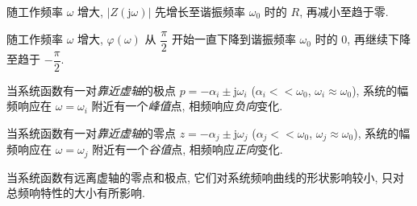 随工作频率 $\omega$ 增大, $|Z(\mathrm{j}\omega)|$ 先增长至谐振频率 $\omega_0$ 时的 $R$, 再减小至趋于零.

随工作频率 $\omega$ 增大, $\varphi(\omega)$ 从 $\dfrac{\pi}{2}$ 开始一直下降到谐振频率 $\omega_0$ 时的 $0$, 再继续下降至趋于 $-\dfrac{\pi}{2}$.

\noindent\hrulefill

当系统函数有一对\textit{靠近虚轴}的极点 $p=-\alpha_i\pm\mathrm{j}\omega_i$ ($\alpha_i<<\omega_0$, $\omega_i\approx\omega_0$), 系统的幅频响应在 $\omega=\omega_i$ 附近有一个\textit{峰值}点, 相频响应\textit{负向}变化.

当系统函数有一对\textit{靠近虚轴}的零点 $z=-\alpha_j\pm\mathrm{j}\omega_j$ ($\alpha_j<<\omega_0$, $\omega_j\approx\omega_0$), 系统的幅频响应在 $\omega=\omega_j$ 附近有一个\textit{谷值}点, 相频响应\textit{正向}变化.

当系统函数有远离虚轴的零点和极点, 它们对系统频响曲线的形状影响较小, 只对总频响特性的大小有所影响.

